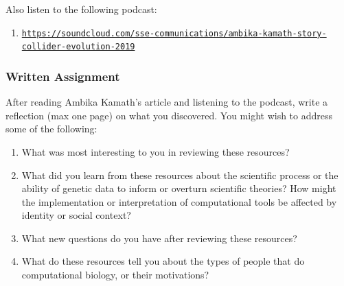 \documentclass{article}
\begin{document}
Also listen to the following podcast:
\begin{enumerate}
\item \texttt{\href{https://soundcloud.com/sse-communications/ambika-kamath-story-collider-evolution-2019}{https://soundcloud.com/sse-communications/ambika-kamath-story-collider-evolution-2019}}
\end{enumerate}

\subsubsection*{Written Assignment} 
After reading Ambika Kamath's article and listening to the podcast, write a reflection (max one page) on what you discovered. You might wish to address some of the following: 

\begin{enumerate}
\item What was most interesting to you in reviewing these resources?
\item What did you learn from these resources about the scientific process or the ability of genetic data to inform or overturn scientific theories? How might the implementation or interpretation of computational tools be affected by identity or social context?
\item What new questions do you have after reviewing these resources?
\item What do these resources tell you about the types of people that do computational biology, or their motivations?
\end{enumerate}

\EndAccSupp{}
\end{document}
